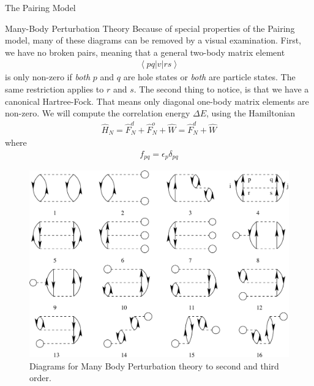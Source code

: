 \documentclass[twoside,english]{uiofysmaster}
\begin{document}
\begin{chapter}{The Pairing Model}
\begin{section}{Many-Body Perturbation Theory}
		Because of special properties of the Pairing model, many of these diagrams can be removed by a visual examination. First, we have no broken pairs, meaning that a general two-body matrix element 
		\begin{align}
			\left< pq | v | rs \right> 
		\end{align}
		is only non-zero if \textit{both} $p$ and $q$ are hole states or \textit{both} are particle states. The same restriction applies to $r$ and $s$. The second thing to notice, is that we have a canonical Hartree-Fock. That means only diagonal one-body matrix elements are non-zero. We will compute the correlation energy $\Delta E$, using the Hamiltonian
		\begin{align}
			\hat H_N = \hat F_N^d + \hat F_N^o + \hat W = \hat F_N^d + \hat W
		\end{align}
		where
		\begin{align}
			f_{pq} = \epsilon_p \delta_{pq}
		\end{align}
 		\begin{figure}[H]
			\includegraphics[width=\textwidth]{Figures/FirstSecondThirdOrder.pdf}
			\caption{Diagrams for Many Body Perturbation theory to second and third order. }
			\label{mbpt23}
		\end{figure}


\end{section}
\end{chapter}
\end{document}
